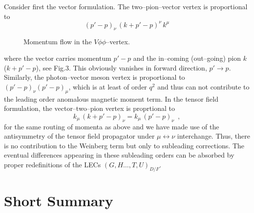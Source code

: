 Consider first the vector formulation. The two--pion--vector vertex
is proportional to
\begin{equation}
(p'-p)_\nu \, (k+p'-p)^\nu \, k^\mu
\end{equation}
\begin{figure}[b]
\hskip 1.7in
\epsfysize=1.5in
\caption{\label{fig3} Momentum flow in  the $V\phi \phi$--vertex.}
\end{figure}
where the vector carries momentum $p'-p$ and the in--coming
(out--going) pion $k$ ($k+p'-p$), see Fig.3. This obviously vanishes in forward
direction, $p' \to p$. Similarly, the photon--vector meson vertex is
proportional to $(p'-p)_\nu (p' -p)_\mu$, which is at least of order
$q^2$ and thus can not contribute to the leading order anomalous
magnetic moment term.  In the tensor field formulation, the
vector--two--pion vertex is proprtional to
\begin{equation}
k_\mu \, (k+p'-p)_\nu = k_\mu \, (p' - p)_\nu \, \, \, ,
\end{equation}
for the same routing of momenta as above and we have made use of the
antisymmetry of the tensor field propagator under $\mu \leftrightarrow
\nu$ interchange. Thus, there is no contribution to the Weinberg term
but only to subleading corrections. The eventual differences appearing
in these subleading orders can be absorbed by proper redefinitions of
the LECs $(G,H \ldots, T,U)_{D/F}$.



\section{Short Summary}

